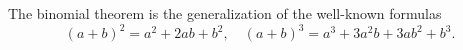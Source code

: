 

\setcounter{section}{3}
\setcounter{subsection}{4}
\setcounter{dfn}{6}

The binomial theorem is the generalization of the well-known formulas
\[
(a+b)^2 = a^2 + 2ab + b^2, \quad (a+b)^3 = a^3 + 3a^2b + 3ab^2 + b^3.
\]



